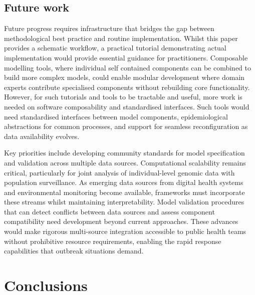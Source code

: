 \documentclass{article}
\begin{document}
\subsection{Future work}

Future progress requires infrastructure that bridges the gap between methodological best practice and routine implementation.
Whilst this paper provides a schematic workflow, a practical tutorial demonstrating actual implementation would provide essential guidance for practitioners.
Composable modelling tools, where individual self contained components can be combined to build more complex models, could enable modular development where domain experts contribute specialised components without rebuilding core functionality.
However, for such tutorials and tools to be tractable and useful, more work is needed on software composability and standardised interfaces.
Such tools would need standardised interfaces between model components, epidemiological abstractions for common processes, and support for seamless reconfiguration as data availability evolves.

Key priorities include developing community standards for model specification and validation across multiple data sources.
Computational scalability remains critical, particularly for joint analysis of individual-level genomic data with population surveillance.
As emerging data sources from digital health systems and environmental monitoring become available, frameworks must incorporate these streams whilst maintaining interpretability.
Model validation procedures that can detect conflicts between data sources and assess component compatibility need development beyond current approaches.
These advances would make rigorous multi-source integration accessible to public health teams without prohibitive resource requirements, enabling the rapid response capabilities that outbreak situations demand.


\section{Conclusions}
\end{document}
